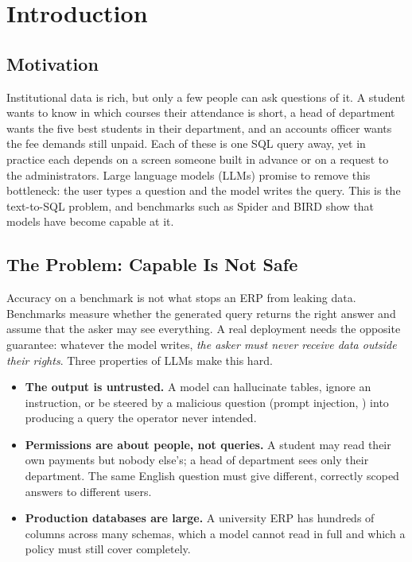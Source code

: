 \chapter{Introduction}
\label{ch:intro}

\section{Motivation}

Institutional data is rich, but only a few people can ask questions of it. A student wants to know
in which courses their attendance is short, a head of department wants the five best students in
their department, and an accounts officer wants the fee demands still unpaid. Each of these is one
SQL query away, yet in practice each depends on a screen someone built in advance or on a request to
the administrators. Large language models (LLMs) promise to remove this bottleneck: the user types a
question and the model writes the query. This is the text-to-SQL problem, and benchmarks such as
Spider \citep{yu2018spider} and BIRD \citep{li2023bird} show that models have become capable at it.

\section{The Problem: Capable Is Not Safe}

Accuracy on a benchmark is not what stops an ERP from leaking data. Benchmarks measure whether the
generated query returns the right answer and assume that the asker may see everything. A real
deployment needs the opposite guarantee: whatever the model writes, \emph{the asker must never
receive data outside their rights}. Three properties of LLMs make this hard.

\begin{itemize}
  \item \textbf{The output is untrusted.} A model can hallucinate tables, ignore an instruction, or
        be steered by a malicious question (prompt injection, \citealp{perez2022ignore}) into
        producing a query the operator never intended.
  \item \textbf{Permissions are about people, not queries.} A student may read their own payments but
        nobody else's; a head of department sees only their department. The same English question
        must give different, correctly scoped answers to different users.
  \item \textbf{Production databases are large.} A university ERP has hundreds of columns across many
        schemas, which a model cannot read in full and which a policy must still cover completely.
\end{itemize}

